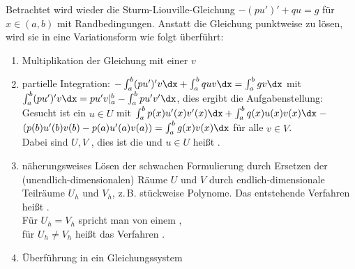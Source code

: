 \begin{Bem}
    Betrachtet wird wieder die Sturm-Liouville-Gleichung
    $-(pu')' + qu = g$ für\\
    $x \in (a, b)$ mit Randbedingungen.
    Anstatt die Gleichung punktweise zu lösen, wird sie in eine
    Variationsform wie folgt überführt:
    \begin{enumerate}
        \item
        Multiplikation der Gleichung mit einer  $v$

        \item
        partielle Integration:
        $-\int_a^b (pu')'v\dx + \int_a^b quv\dx = \int_a^b gv\dx$ mit\\
        $\int_a^b (pu')'v\dx = pu'v|_a^b - \int_a^b pu'v'\dx$,
        dies ergibt die Aufgabenstellung:\\
        Gesucht ist ein $u \in U$ mit
        $\int_a^b p(x)u'(x)v'(x)\dx + \int_a^b q(x)u(x)v(x)\dx \;-$\\
        $(p(b)u'(b)v(b) - p(a)u'(a)v(a)) = \int_a^b g(x)v(x)\dx$
        für alle $v \in V$.\\
        Dabei sind $U, V$ ,
        dies ist die  und
        $u \in U$ heißt .

        \item
        näherungsweises Lösen der schwachen Formulierung durch Ersetzen
        der (unendlich-dimen\-sionalen) Räume $U$ und $V$ durch
        endlich-dimensionale Teilräume $U_h$ und $V_h$, z.\,B.
        stückweise Polynome.
        Das entstehende Verfahren heißt .\\
        Für $U_h = V_h$ spricht man von einem
        ,\\
        für $U_h \not= V_h$ heißt das Verfahren
        .

        \item
        Überführung in ein Gleichungssystem
    \end{enumerate}
\end{Bem}

\linie

